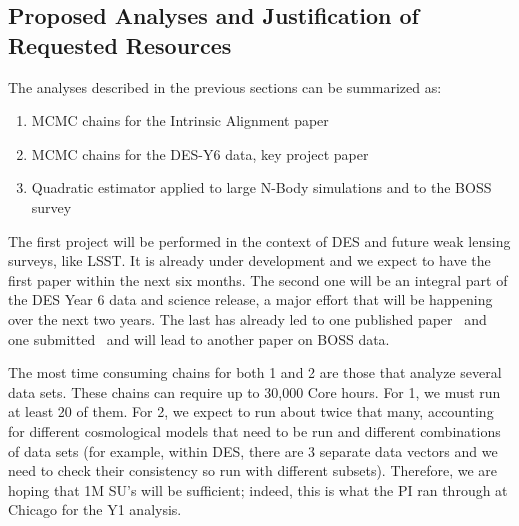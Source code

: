 \documentclass[12pt]{article}
\newcommand{\peikai}[1]{\textcolor{blue}{PL: #1}}
\begin{document}
\begin{small}

\section{Proposed Analyses and Justification of Requested Resources}

The analyses described in the previous sections can be summarized as:
\begin{enumerate}
\item MCMC chains for the Intrinsic Alignment paper
\item MCMC chains for the DES-Y6 data, key project paper
\item Quadratic estimator applied to large N-Body simulations and to the BOSS survey
\end{enumerate}
The first project will be performed in the context of DES and future weak lensing surveys, like LSST. It is already under development and we expect to have the first paper within the next six months. The second one will be an integral part of the DES Year 6 data and science release, a major effort that will be happening over the next two years. The last has already led to one published paper~\cite{Li:2020uug} and one submitted~\cite{Li:2020luq} and will lead to another paper on BOSS data.


The most time consuming chains for both 1 and 2 are those that analyze several data sets.%
These chains can require up to 30,000 Core hours. For 1, we must run at least 20 of them. %
For 2, we expect to run about twice that many, accounting for different cosmological models that need to be run and different combinations of data sets (for example, within DES, there are 3 separate data vectors and we need to check their consistency so run with different subsets). Therefore, we are hoping that 1M SU's will be sufficient; indeed, this is what the PI ran through at Chicago for the Y1 analysis.


\end{small}
\end{document}
